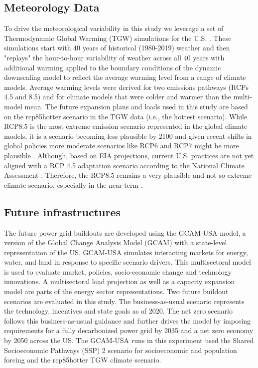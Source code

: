 \documentclass{agujournal2019}
\begin{document}
\subsection{Meteorology Data}
To drive the meteorological variability in this study we leverage a set of Thermodynamic Global Warming (TGW) simulations for the U.S. \cite{Jones2022,Jones2023}. These simulations start with 40 years of historical (1980-2019) weather and then "replays" the hour-to-hour variability of weather across all 40 years with additional warming applied to the boundary conditions of the dynamic downscaling model to reflect the average warming level from a range of climate models. Average warming levels were derived for two emissions pathways (RCPs 4.5 and 8.5) and for climate models that were colder and warmer than the multi-model mean. The future expansion plans and loads used in this study are based on the rcp85hotter scenario in the TGW data (i.e., the hottest scenario). While RCP8.5 is the most extreme emission scenario represented in the global climate models, it is a scenario becoming less plausible by 2100 and given recent shifts in global policies more moderate scenarios like RCP6 and RCP7 might be more plausible \cite{Hersbach2020a}. Although, based on EIA projections, current U.S. practices are not yet aligned with a RCP 4.5 adaptation scenario according to the National Climate Assessment \cite{RN8307}. Therefore, the RCP8.5 remains a very plausible and not-so-extreme climate scenario, especially in the near term \cite{Schwalm_2020}. 

\subsection{Future infrastructures}
The future power grid buildouts are developed using the GCAM-USA model, a version of the Global Change Analysis Model (GCAM) with a state-level representation of the US. GCAM-USA simulates interacting markets for energy, water, and land in response to specific scenario drivers. This multisectoral model is used to evaluate market, policies, socio-economic change and technology innovations. A multisectoral load projection as well as a capacity expansion model are parts of the energy sector representations. Two future buildout scenarios are evaluated in this study. The business-as-usual scenario represents the technology, incentives and state goals as of 2020. The net zero scenario follows this business-as-usual guidance and further drives the model by imposing requirements for a fully decarbonized power grid by 2035 and a net zero economy by 2050 across the US. The GCAM-USA runs in this experiment used the Shared Socioeconomic Pathways (SSP) 2 scenario for socioeconomic and population forcing and the rcp85hotter TGW climate scenario. 
\end{document}
